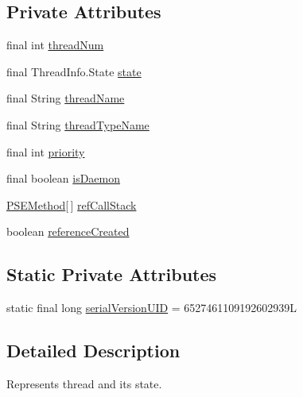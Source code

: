 \subsection*{Private Attributes}
\begin{DoxyCompactItemize}
\item 
final int \hyperlink{classgov_1_1nasa_1_1jpf_1_1inspector_1_1common_1_1pse_1_1_p_s_e_thread_a3b7f4cdc39c117146376d21c63fc1f3d}{thread\+Num}
\item 
final Thread\+Info.\+State \hyperlink{classgov_1_1nasa_1_1jpf_1_1inspector_1_1common_1_1pse_1_1_p_s_e_thread_a9972c3b2bc7a38873fe37e14a0e2af67}{state}
\item 
final String \hyperlink{classgov_1_1nasa_1_1jpf_1_1inspector_1_1common_1_1pse_1_1_p_s_e_thread_a075e744f2cc4e7885af71e0625b5c132}{thread\+Name}
\item 
final String \hyperlink{classgov_1_1nasa_1_1jpf_1_1inspector_1_1common_1_1pse_1_1_p_s_e_thread_a6b17e072db94a8a4282a5cc399329e9f}{thread\+Type\+Name}
\item 
final int \hyperlink{classgov_1_1nasa_1_1jpf_1_1inspector_1_1common_1_1pse_1_1_p_s_e_thread_a0e55c32204a21487b6e039ec6b762484}{priority}
\item 
final boolean \hyperlink{classgov_1_1nasa_1_1jpf_1_1inspector_1_1common_1_1pse_1_1_p_s_e_thread_aebf75d37fe7e11d67a21110f0d3cc2cb}{is\+Daemon}
\item 
\hyperlink{classgov_1_1nasa_1_1jpf_1_1inspector_1_1common_1_1pse_1_1_p_s_e_method}{P\+S\+E\+Method}\mbox{[}$\,$\mbox{]} \hyperlink{classgov_1_1nasa_1_1jpf_1_1inspector_1_1common_1_1pse_1_1_p_s_e_thread_ab58439523bd89041bdbf143dffd6341d}{ref\+Call\+Stack}
\item 
boolean \hyperlink{classgov_1_1nasa_1_1jpf_1_1inspector_1_1common_1_1pse_1_1_p_s_e_thread_a920fb66d370e5a3c025c689f3de5d017}{reference\+Created}
\end{DoxyCompactItemize}
\subsection*{Static Private Attributes}
\begin{DoxyCompactItemize}
\item 
static final long \hyperlink{classgov_1_1nasa_1_1jpf_1_1inspector_1_1common_1_1pse_1_1_p_s_e_thread_aba6cbfca644d3eeb73bb5bb30560ee21}{serial\+Version\+U\+ID} = 6527461109192602939L
\end{DoxyCompactItemize}


\subsection{Detailed Description}
Represents thread and its state. 

